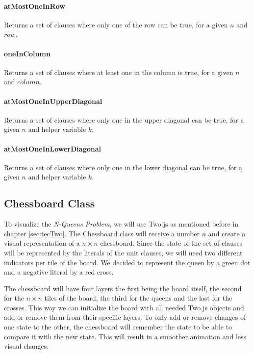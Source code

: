 \paragraph{atMostOneInRow}
Returns a set of clauses where only one of the row can be true, for a given $n$ and $row$.

\paragraph{oneInColumn}
Returns a set of clauses where at least one in the column is true, for a given $n$ and $column$.

\paragraph{atMostOneInUpperDiagonal}
Returns a set of clauses where only one in the upper diagonal can be true, for a given $n$ and helper variable $k$.

\paragraph{atMostOneInLowerDiagonal}
Returns a set of clauses where only one in the lower diagonal can be true, for a given $n$ and helper variable $k$.

\subsection{Chessboard Class}
\label{sub:impChessboard}
To visualize the \textit{N-Queens Problem}, we will use Two.js as mentioned before in chapter \ref{sec:tecTwo}. The Chessboard class will receive a number $n$ and create a visual representation of a $n \times n$ chessboard. Since the state of the set of clauses will be represented by the literals of the unit clauses, we will need two different indicators per tile of the board. We decided to represent the queen by a green dot and a negative literal by a red cross.

The chessboard will have four layers the first being the board itself, the second for the $n \times n$ tiles of the board, the third for the queens and the last for the crosses. This way we can initialize the board with all needed Two.js objects and add or remove them from their specific layers. To only add or remove changes of one state to the other, the chessboard will remember the state to be able to compare it with the new state. This will result in a smoother animation and less visual changes.


